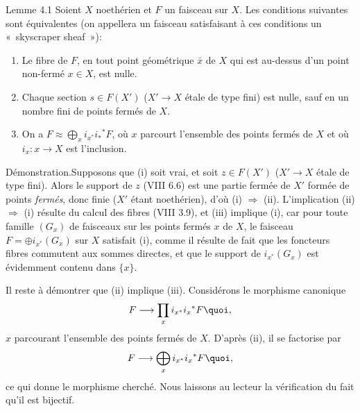 \documentclass[10pt]{../fichiers-configuration-latex/smfart}
\begin{document}
\begin{enonce*}{Lemme 4.1}
Soient $X$ noethérien et $F$ un faisceau sur $X$. Les conditions
suivantes sont équivalentes (on appellera un faisceau satisfaisant à
ces conditions un « skyscraper sheaf »):
\begin{enumerate}
\renewcommand{\theenumi}{\roman{enumi}}
\renewcommand{\labelenumi}{(\theenumi)}
\item Le fibre de $F$, en tout point géométrique $\bar{x}$ de $X$ qui
est au-dessus d'un point non-fermé $x\in X$, est nulle.

\item Chaque section $s\in F(X')$ ($X'\rightarrow X$ étale de type
fini) est nulle, sauf en un nombre fini de points fermés de $X$.

\item On a $F\approx ⨁_x i_{x^{\ast}}i_{\ast}{}^{\ast}F$, où $x$
parcourt l'ensemble des points fermés de $X$ et où $i_x:x\rightarrow
X$ est l'inclusion.
\end{enumerate}
\end{enonce*}

Démonstration.\pageoriginale Supposons que (i) soit vrai, et soit
$z\in F(X')$ ($X'\rightarrow X$ étale de type fini). Alors le support
de $z$ (VIII 6.6) est une partie fermée de $X'$ formée de points
\emph{fermés}, donc finie ($X'$ étant noethérien), d'où (i)
$\Rightarrow$ (ii). L'implication (ii) $\Rightarrow$ (i) résulte du
calcul des fibres (VIII 3.9), et (iii) implique (i), car pour toute
famille $(G_x)$ de faisceaux sur les points fermés $x$ de $X$, le
faisceau $F=\oplus i_{x^{\ast}}(G_x)$ sur $X$ satisfait (i), comme il
résulte de fait que les foncteurs fibres commutent aux sommes
directes, et que le support de $i_{x^{\ast}}(G_x)$ est évidemment
contenu dans $\{x\}$.

Il reste à démontrer que (ii) implique (iii). Considérons le morphisme
canonique
$$
F\longrightarrow \prod_x i_{x^{\ast}}i_{x}{}^\ast F{\quoi},
$$
$x$ parcourant l'ensemble des points fermés de $X$. D'après (ii), il
se factorise par
$$
F\longrightarrow \bigoplus_x i_{x^{\ast}}i_x{}^\ast F{\quoi},
$$
ce qui donne le morphisme cherché. Nous laissons au lecteur la
vérification du fait qu'il est bijectif.

\setcounter{subsection}{1}
\end{document}
